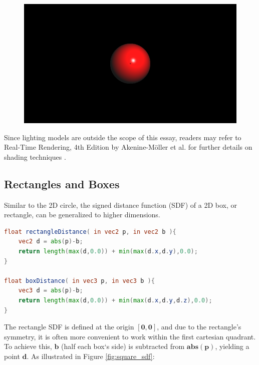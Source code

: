 \begin{figure}[ht]
    \centering
  \includegraphics[width=.6\linewidth]{imagens/sdf-sphere.png}
  \label{fig:sdf-sphere}
\end{figure}

Since lighting models are outside the scope of this essay, readers may refer to Real-Time Rendering, 4th Edition by Akenine-Möller et al. for further details on shading techniques \cite{akenine-moller2018realtimerendering}.

\subsection{Rectangles and Boxes}


Similar to the 2D circle, the signed distance function (SDF) of a 2D box, or rectangle, can be generalized to higher dimensions.

\begin{lstlisting}[language=GLSL, caption={Code 4: Rectangle and Box SDF}, label={lst:RectangleAndBox} float=H]
float rectangleDistance( in vec2 p, in vec2 b ){
    vec2 d = abs(p)-b;
    return length(max(d,0.0)) + min(max(d.x,d.y),0.0);
}

float boxDistance( in vec3 p, in vec3 b ){
    vec3 d = abs(p)-b;
    return length(max(d,0.0)) + min(max(d.x,d.y,d.z),0.0);
}
\end{lstlisting}

The rectangle SDF is defined at the origin $\mathbf{[0,0]}$, and due to the rectangle's symmetry, it is often more convenient to work within the first cartesian quadrant. To achieve this, $\mathbf{b}$ (half each box`s side) is subtracted from $\mathbf{abs(p)}$, yielding a point $\mathbf{d}$. As illustrated in Figure \ref{fig:square_sdf}:

